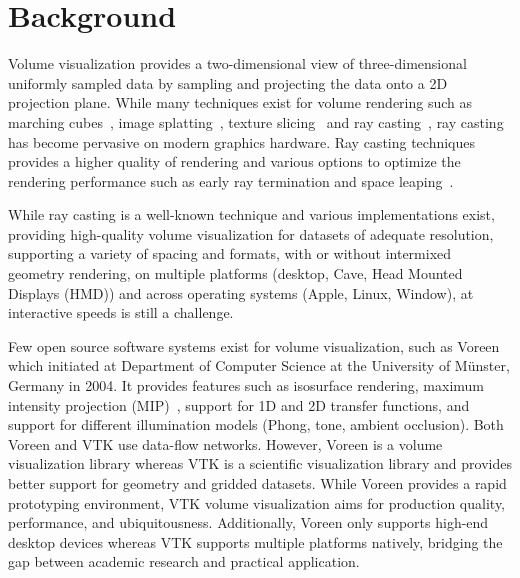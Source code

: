 \section{Background}
\label{relatedwork}

Volume visualization provides a two-dimensional view of three-dimensional
uniformly sampled data by sampling and projecting the data onto a 2D
projection plane.  While many techniques exist for volume rendering such as
marching cubes~\citep{lorensen_marching_1987}, image
splatting~\citep{westover_footprint_1990}, texture
slicing~\citep{rezk_salama_interactive_2000, engel_high-quality_2001} and ray
casting~\citep{hsu_segmented_1993, ma_parallel_1995, ma_scalable_1997,
heng_gpu-based_2005}, ray casting has become pervasive on modern graphics
hardware. Ray casting techniques provides a higher quality of rendering and
various options to optimize the rendering performance such as early ray
termination and space leaping~\citep{yagel_accelerating_1993}.

While ray casting is a well-known technique and various implementations exist,
providing high-quality volume visualization for datasets of adequate
resolution, supporting a variety of spacing and formats, with or without
intermixed geometry rendering, on multiple platforms (desktop, Cave, Head
Mounted Displays (HMD)) and across operating systems (Apple, Linux, Window), at
interactive speeds is still a challenge.

Few open source software systems exist for volume visualization, such as
Voreen~\citep{meyer-spradow_voreen:_2009} which initiated at Department of
Computer Science at the University of M\"unster, Germany in 2004.  It provides
features such as isosurface rendering, maximum intensity projection
(MIP)~\citep{wallis_three-dimensional_1989}, support for 1D and 2D transfer
functions, and support for different illumination models (Phong, tone, ambient
occlusion). Both Voreen and VTK use data-flow networks. However, Voreen is a
volume visualization library whereas VTK is a scientific visualization library
and provides better support for geometry and gridded datasets. While Voreen
provides a rapid prototyping environment, VTK volume visualization aims for
production quality, performance, and ubiquitousness. Additionally, Voreen only
supports high-end desktop devices whereas VTK supports multiple platforms
natively, bridging the gap between academic research and practical application.

